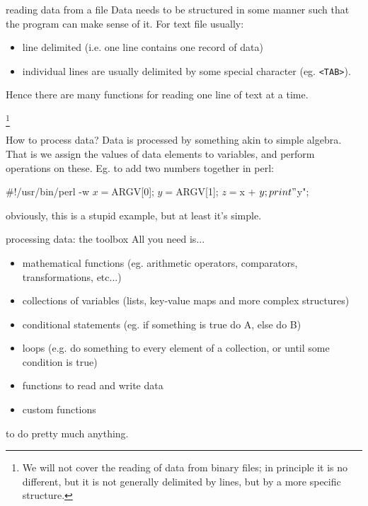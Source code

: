 \documentclass[pdf]{beamer}
\newcommand\blfootnote[1]{%
  \begingroup  %
  \renewcommand\thefootnote{}\footnote{#1}%
  \addtocounter{footnote}{-1}  %
  \endgroup
}
\begin{document}
\begin{frame}{reading data from a file}
  Data needs to be structured in some manner such that the program can make
  sense of it. For text file usually:
  \begin{itemize}
  \item line delimited (i.e. one line contains one record of data)
  \item individual lines are usually delimited by some special character
    (eg. \texttt{<TAB>}).
  \end{itemize}

  Hence there are many functions for reading one line of text at a time.

  \blfootnote{We will not cover the reading of data from binary files; in
    principle it is no different, but it is not generally delimited by lines,
    but by a more specific structure.}
\end{frame}

\begin{frame}[fragile]{How to process data?}
  Data is processed by something akin to simple algebra. That is we assign the
  values of data elements to variables, and perform operations on
  these. Eg. to add two numbers together in perl:
  
  \begin{perlcode}
    #!/usr/bin/perl -w
    $x = $ARGV[0];
    $y = $ARGV[1];
    $z = $x + $y;
    print "$y\n";
  \end{perlcode}
  
  obviously, this is a stupid example, but at least it's simple.
\end{frame}

\begin{frame}[fragile]{processing data: the toolbox}
  All you need is...

  \begin{itemize}
  \item mathematical functions (eg. arithmetic operators, comparators,
    transformations, etc...)
  \item collections of variables (lists, key-value maps and more complex structures)
  \item conditional statements (eg. if something is true do A, else do B)
  \item loops (e.g. do something to every element of a collection, or until
    some condition is true)
  \item functions to read and write data
  \item custom functions
  \end{itemize}

  to do pretty much anything.
\end{frame}
\end{document}
